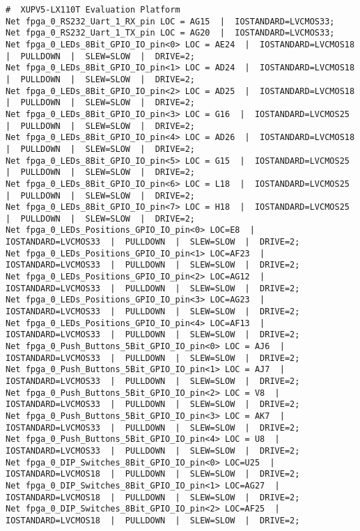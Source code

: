 \begin{verbatim}
#  XUPV5-LX110T Evaluation Platform
Net fpga_0_RS232_Uart_1_RX_pin LOC = AG15  |  IOSTANDARD=LVCMOS33;
Net fpga_0_RS232_Uart_1_TX_pin LOC = AG20  |  IOSTANDARD=LVCMOS33;
Net fpga_0_LEDs_8Bit_GPIO_IO_pin<0> LOC = AE24  |  IOSTANDARD=LVCMOS18  |  PULLDOWN  |  SLEW=SLOW  |  DRIVE=2;
Net fpga_0_LEDs_8Bit_GPIO_IO_pin<1> LOC = AD24  |  IOSTANDARD=LVCMOS18  |  PULLDOWN  |  SLEW=SLOW  |  DRIVE=2;
Net fpga_0_LEDs_8Bit_GPIO_IO_pin<2> LOC = AD25  |  IOSTANDARD=LVCMOS18  |  PULLDOWN  |  SLEW=SLOW  |  DRIVE=2;
Net fpga_0_LEDs_8Bit_GPIO_IO_pin<3> LOC = G16  |  IOSTANDARD=LVCMOS25  |  PULLDOWN  |  SLEW=SLOW  |  DRIVE=2;
Net fpga_0_LEDs_8Bit_GPIO_IO_pin<4> LOC = AD26  |  IOSTANDARD=LVCMOS18  |  PULLDOWN  |  SLEW=SLOW  |  DRIVE=2;
Net fpga_0_LEDs_8Bit_GPIO_IO_pin<5> LOC = G15  |  IOSTANDARD=LVCMOS25  |  PULLDOWN  |  SLEW=SLOW  |  DRIVE=2;
Net fpga_0_LEDs_8Bit_GPIO_IO_pin<6> LOC = L18  |  IOSTANDARD=LVCMOS25  |  PULLDOWN  |  SLEW=SLOW  |  DRIVE=2;
Net fpga_0_LEDs_8Bit_GPIO_IO_pin<7> LOC = H18  |  IOSTANDARD=LVCMOS25  |  PULLDOWN  |  SLEW=SLOW  |  DRIVE=2;
Net fpga_0_LEDs_Positions_GPIO_IO_pin<0> LOC=E8  |  IOSTANDARD=LVCMOS33  |  PULLDOWN  |  SLEW=SLOW  |  DRIVE=2;
Net fpga_0_LEDs_Positions_GPIO_IO_pin<1> LOC=AF23  |  IOSTANDARD=LVCMOS33  |  PULLDOWN  |  SLEW=SLOW  |  DRIVE=2;
Net fpga_0_LEDs_Positions_GPIO_IO_pin<2> LOC=AG12  |  IOSTANDARD=LVCMOS33  |  PULLDOWN  |  SLEW=SLOW  |  DRIVE=2;
Net fpga_0_LEDs_Positions_GPIO_IO_pin<3> LOC=AG23  |  IOSTANDARD=LVCMOS33  |  PULLDOWN  |  SLEW=SLOW  |  DRIVE=2;
Net fpga_0_LEDs_Positions_GPIO_IO_pin<4> LOC=AF13  |  IOSTANDARD=LVCMOS33  |  PULLDOWN  |  SLEW=SLOW  |  DRIVE=2;
Net fpga_0_Push_Buttons_5Bit_GPIO_IO_pin<0> LOC = AJ6  |  IOSTANDARD=LVCMOS33  |  PULLDOWN  |  SLEW=SLOW  |  DRIVE=2;
Net fpga_0_Push_Buttons_5Bit_GPIO_IO_pin<1> LOC = AJ7  |  IOSTANDARD=LVCMOS33  |  PULLDOWN  |  SLEW=SLOW  |  DRIVE=2;
Net fpga_0_Push_Buttons_5Bit_GPIO_IO_pin<2> LOC = V8  |  IOSTANDARD=LVCMOS33  |  PULLDOWN  |  SLEW=SLOW  |  DRIVE=2;
Net fpga_0_Push_Buttons_5Bit_GPIO_IO_pin<3> LOC = AK7  |  IOSTANDARD=LVCMOS33  |  PULLDOWN  |  SLEW=SLOW  |  DRIVE=2;
Net fpga_0_Push_Buttons_5Bit_GPIO_IO_pin<4> LOC = U8  |  IOSTANDARD=LVCMOS33  |  PULLDOWN  |  SLEW=SLOW  |  DRIVE=2;
Net fpga_0_DIP_Switches_8Bit_GPIO_IO_pin<0> LOC=U25  |  IOSTANDARD=LVCMOS18  |  PULLDOWN  |  SLEW=SLOW  |  DRIVE=2;
Net fpga_0_DIP_Switches_8Bit_GPIO_IO_pin<1> LOC=AG27  |  IOSTANDARD=LVCMOS18  |  PULLDOWN  |  SLEW=SLOW  |  DRIVE=2;
Net fpga_0_DIP_Switches_8Bit_GPIO_IO_pin<2> LOC=AF25  |  IOSTANDARD=LVCMOS18  |  PULLDOWN  |  SLEW=SLOW  |  DRIVE=2;

\end{verbatim}
